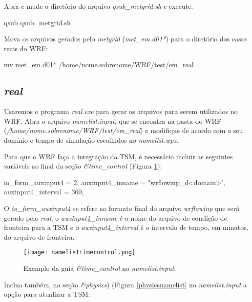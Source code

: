 \noindent Abra e mude o diretório do arquivo \textit{qsub\_metgrid.sh} e execute:
\bigskip

\begin{bashcode}
qsub qsub_metgrid.sh
\end{bashcode}
\bigskip

\noindent Mova os arquivos gerados pelo \textit{metgrid} (\textit{met\_em.d01*}) para o diretório dos casos reais do WRF:
\bigskip

\begin{bashcode}
 mv met_em.d01* /home/nome.sobrenome/WRF/test/em_real
\end{bashcode}
\bigskip

\subsection{\textit{real}}
\bigskip

\noindent Usaremos o programa \textit{real.exe} para gerar os arquivos para serem utilizados no WRF. Abra o arquivo \textit{namelist.input}, que se encontra na pasta do WRF (\textit{/home/nome.sobrenome/WRF/test/em\_real}) e modifique de acordo com o seu domínio e tempo de simulação escolhidos no \textit{namelist.wps}.
\bigskip

\noindent Para que o WRF faça a integração da TSM, é necessário incluir as seguintes variáveis ao final da seção \textit{\&time\_control} (Figura \textcolor{bleu_cite}{\ref{timecontrolnamelist}}):
\bigskip

\begin{bashcode}
io_form_auxinput4  = 2,
auxinput4_inname   = "wrflowinp_d<domain>",
auxinput4_interval = 360,
\end{bashcode}
\bigskip

\noindent O \textit{io\_form\_auxinput4} se refere ao formato final do arquivo \textit{wrflowinp} que será gerado pelo \textit{real}, o \textit{auxinput4\_inname} é o nome do arquivo de condição de fronteira para a TSM e o \textit{auxinput4\_interval} é o intervalo de tempo, em minutos, do arquivo de fronteira.
\bigskip

\begin{figure}[H]
    \centering
    \texttt{[image: namelisttimecontrol.png]}
    \caption{Exemplo da guia \textit{\&time\_control} no \textit{namelist.input}.}
    \label{timecontrolnamelist}
\end{figure}
\bigskip

\noindent Inclua também, na seção \textit{\&physics}) (Figura \textcolor{bleu_cite}{\ref{physicsnamelist}} no \textit{namelist.input} a opção para atualizar a TSM:
\bigskip

